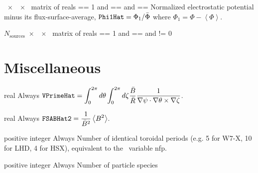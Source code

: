 {~$\times$~~$\times$~ matrix of reals}
{ == 1 and  == \true and  == \true}
{Normalized electrostatic potential minus its flux-surface-average, $\displaystyle \text{\ttfamily Phi1Hat} =  \Phi_1/\bar{\Phi}$ where $\Phi_1 = \Phi-\left<\Phi\right>$.}

\myhrule

{$N_{\mathrm{sources}}$~$\times$~~$\times$~ matrix of reals}
{ == 1 and  == \true and  != 0}
{ }

\myhrule

\section{Miscellaneous}
\label{sec:Miscellaneous}

\myhrule

{real}
{Always}
{$\displaystyle \text{\ttfamily VPrimeHat} =  \int_{0}^{2 \pi} d \theta \int_{0}^{2 \pi} d \zeta \frac{\bar{B}}{\bar{R}} \frac{1}{\nabla \psi \cdot \nabla \theta \times \nabla \zeta}$.}

\myhrule

{real}
{Always}
{$\displaystyle \text{\ttfamily FSABHat2} =  \frac{1}{\bar{B}^2} \left\langle B^2 \right\rangle$.}

\myhrule

{positive integer}
{Always}
{Number of identical toroidal periods (e.g. 5 for W7-X, 10 for LHD, 4 for HSX), equivalent to the \vmec~variable nfp.}

\myhrule

{positive integer}
{Always}
{Number of particle species}

\myhrule

%
%
%

